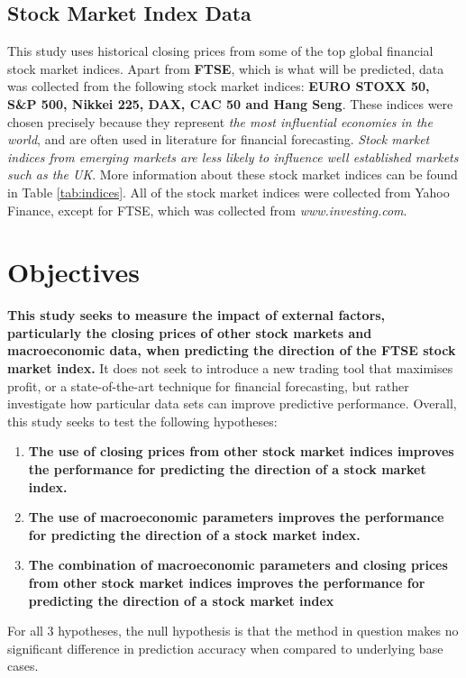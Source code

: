\documentclass{UoYCSproject}
\begin{document}
\subsection{Stock Market Index Data}
This study uses historical closing prices from some of the top global financial stock market indices. Apart from \textbf{FTSE}, which is what will be predicted, data was collected from the following stock market indices: \textbf{EURO STOXX 50, S\&P 500, Nikkei 225, DAX, CAC 50 and Hang Seng}. These indices were chosen precisely because they represent \textit{the most influential economies in the world}, and are often used in literature for financial forecasting. \textit{Stock market indices from emerging markets are less likely to influence well established markets such as the UK}.  More information about these stock market indices can be found in Table \ref{tab:indices}. All of the stock market indices were collected from Yahoo Finance, except for FTSE, which was collected from \textit{www.investing.com}. 

\section{Objectives}
\label{sec:objectives}
\textbf{This study seeks to measure the impact of external factors, particularly the closing prices of other stock markets and macroeconomic data, when predicting the direction of the FTSE stock market index.} It does not seek to introduce a new trading tool that maximises profit, or a state-of-the-art technique for financial forecasting, but rather investigate how particular data sets can improve predictive performance. Overall, this study seeks to test the following hypotheses:

\begin{enumerate}
    \item \label{h1} \textbf{The use of closing prices from other stock market indices improves the performance for predicting the direction of a stock market index.}
    \item \label{h2} \textbf{The use of macroeconomic parameters improves the performance for predicting the direction of a stock market index.}
    \item \label{h3} \textbf{The combination of macroeconomic parameters and closing prices from other stock market indices improves the performance for predicting  the direction of a stock market index}
\end{enumerate}

For all 3 hypotheses, the null hypothesis is that the method in question makes no significant difference in prediction accuracy when compared to underlying base cases.
\end{document}
